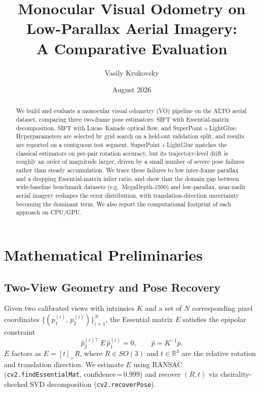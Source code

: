 \documentclass[11pt,a4paper]{article}
\title{Monocular Visual Odometry on Low-Parallax Aerial Imagery:\\
       A Comparative Evaluation}
\author{Vasily Krukovsky}
\date{August 2026}
\begin{document}
\maketitle

\begin{abstract}
We build and evaluate a monocular visual odometry (VO) pipeline on the
ALTO aerial dataset, comparing three two-frame pose estimators: SIFT
with Essential-matrix decomposition, SIFT with Lucas--Kanade optical
flow, and SuperPoint\,+\,LightGlue. Hyperparameters are selected by grid
search on a held-out validation split, and results are reported on a
contiguous test segment. SuperPoint\,+\,LightGlue matches the classical
estimators on per-pair rotation accuracy, but its trajectory-level
drift is roughly an order of magnitude larger, driven by a small
number of severe pose failures rather than steady accumulation. We
trace these failures to low inter-frame parallax and a dropping
Essential-matrix inlier ratio, and show that the domain gap between
wide-baseline benchmark datasets (e.g.\ MegaDepth-1500) and
low-parallax, near-nadir aerial imagery reshapes the error
distribution, with translation-direction uncertainty becoming the
dominant term. We also report the computational footprint of each
approach on CPU/GPU.
\end{abstract}

\section{Mathematical Preliminaries}

\subsection{Two-View Geometry and Pose Recovery}
Given two calibrated views with intrinsics $K$ and a set of $N$
corresponding pixel coordinates
$\{(p_1^{(i)},\, p_2^{(i)})\}_{i=1}^{N}$, the Essential matrix $E$
satisfies the epipolar constraint
\begin{equation}
  \hat{p}_2^{(i)\top}\, E\, \hat{p}_1^{(i)} = 0,
  \qquad \hat{p} = K^{-1}p .
\end{equation}
$E$ factors as $E = [t]_{\times}R$, where $R \in SO(3)$ and
$t \in \mathbb{R}^3$ are the relative rotation and translation
direction.  We estimate $E$ using RANSAC
(\texttt{cv2.findEssentialMat}, confidence\,=\,0.999) and recover
$(R,t)$ via cheirality-checked SVD decomposition
(\texttt{cv2.recoverPose}).
\end{document}
